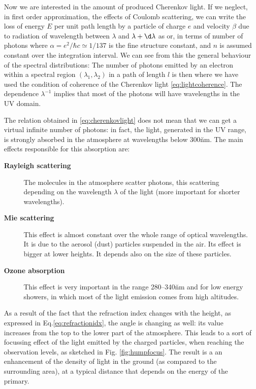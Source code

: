 Now we are interested in the amount of produced Cherenkov light. If we
neglect, in first order approximation, the effects of Coulomb
scattering, we can write the loss of energy $E$ per unit path length
by a particle of charge $e$ and velocity $\beta$ due to \Cherenkov
radiation of wavelength between $\lambda$ and $\lambda+\d \lambda$ as
%
\dEdheq
%
or, in terms of number of photons
%
\dNdheq
%
where $\alpha = e^2/\hbar c \simeq 1/137$ is the fine structure
constant, and $n$ is assumed constant over the integration interval.
We can see from this the general behaviour of the spectral
distributions:
%
\specdistreq
%
The number of photons emitted by an electron within a spectral region
$(\lambda_1,\lambda_2)$ in a path of length $l$ is then
%
\phemiteq
%
where we have used the condition of coherence of the Cherenkov light
\eqref{eq:lightcoherence}. The dependence $\lambda^{-1}$ implies that
most of the photons will have wavelengths in the UV domain.

The relation obtained in \eqref{eq:cherenkovlight} does not mean that
we can get a virtual infinite number of \Cherenkov photons: in fact,
the \Cherenkov light, generated in the UV range, is strongly absorbed
in the atmosphere at wavelengths below 300\u{nm}. The main effects
responsible for this absorption are:

\begin{description}
  
\item[\textbf{Rayleigh scattering}] The molecules in the atmosphere
  scatter photons, this scattering depending on the wavelength
  $\lambda$ of the light (more important for shorter wavelengths).
  
\item[\textbf{Mie scattering}] This effect is almost constant over the
  whole range of optical wavelengths. It is due to the aerosol (dust)
  particles suspended in the air. Its effect is bigger at lower
  heights. It depends also on the size of these particles.
  
\item[\textbf{Ozone absorption}] This effect is very important in the
  range 280--340\u{nm} and for low energy showers, in which most of
  the \Cherenkov light emission comes from high altitudes.

\end{description}

As a result of the fact that the refraction index changes with the
height, as expressed in Eq.\eqref{eq:refractionidx}, the \Cherenkov
angle is changing as well: its value increases from the top to the
lower part of the atmosphere. This leads to a sort of focussing effect
of the \Cherenkov light emitted by the charged particles, when
reaching the observation levels, as sketched in Fig.
\ref{fig:humpfocus}.  The result is a an enhancement of the density of
light in the ground (as compared to the surrounding area), at a
typical distance that depends on the energy of the primary. 

